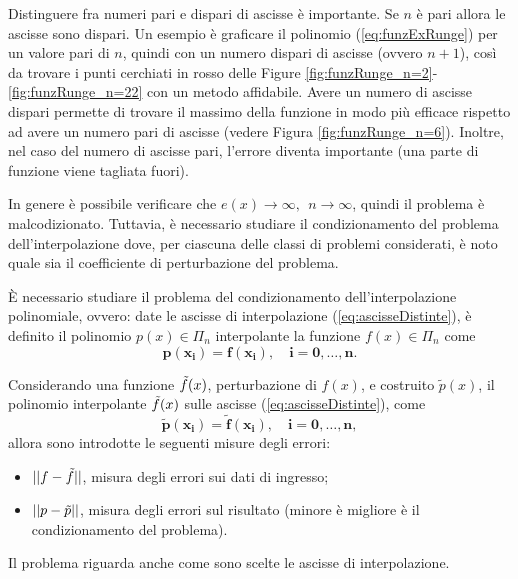\begin{remark}
    Distinguere fra numeri pari e dispari di ascisse è importante. Se $n$ è pari allora  le ascisse sono dispari. Un esempio è graficare il polinomio (\ref{eq:funzExRunge}) per un valore pari di $n$, quindi con un numero dispari di ascisse (ovvero $n+1$), così da trovare i punti cerchiati in rosso delle Figure \ref{fig:funzRunge_n=2}-\ref{fig:funzRunge_n=22} con un metodo affidabile.  Avere un numero di ascisse dispari permette di trovare il massimo della funzione in modo più efficace rispetto ad avere un numero pari di ascisse (vedere Figura \ref{fig:funzRunge_n=6}). Inoltre, nel caso del numero di ascisse pari, l'errore diventa importante (una parte di funzione viene tagliata fuori).
\end{remark}

In genere è possibile verificare che $e(x)\rightarrow\infty,\;\, n\rightarrow\infty$, quindi il problema è malcodizionato. Tuttavia, è necessario studiare il condizionamento del problema dell'interpolazione dove, per ciascuna delle classi di problemi considerati, è noto quale sia il coefficiente di perturbazione del problema.

È necessario studiare il problema del condizionamento dell'interpolazione polinomiale, ovvero: date le ascisse di interpolazione (\ref{eq:ascisseDistinte}), è definito il polinomio $p(x)\in\Pi_n$ interpolante la funzione $f(x)\in\Pi_n$ come
\begin{equation*}
 \boldsymbol{p(x_i)=f(x_i)},\quad\boldsymbol{i=0,\hdots,n}.
\end{equation*}

Considerando una funzione $\Tilde{f}(x)$, perturbazione di $f(x)$, e costruito $\tilde{p}(x)$, il polinomio interpolante $\Tilde{f}(x)$ sulle ascisse (\ref{eq:ascisseDistinte}), come
\begin{equation*}
 \boldsymbol{\tilde{p}(x_i)=\tilde{f}(x_i),\quad i=0,\hdots,n},
\end{equation*}
allora sono introdotte le seguenti misure degli errori:

\begin{itemize}
    \item $||f-\Tilde{f}||$, misura degli errori sui dati di ingresso;
    \item $||p-\Tilde{p}||$, misura degli errori sul risultato (minore è migliore è il condizionamento del problema).
\end{itemize}

Il problema riguarda anche come sono scelte le ascisse di interpolazione.

